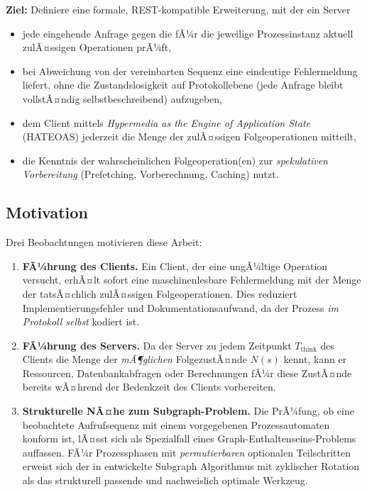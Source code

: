 ﻿\documentclass[a4paper,12pt]{article}
\theoremstyle{definition}
\begin{document}
\textbf{Ziel:} Definiere eine formale, REST-kompatible Erweiterung, mit der ein Server
\begin{itemize}
	\item jede eingehende Anfrage gegen die fÃ¼r die jeweilige Prozessinstanz aktuell
	      zulÃ¤ssigen Operationen prÃ¼ft,
	\item bei Abweichung von der vereinbarten Sequenz eine eindeutige Fehlermeldung liefert,
	      ohne die Zustandslosigkeit auf Protokollebene (jede Anfrage bleibt vollstÃ¤ndig
	      selbstbeschreibend) aufzugeben,
	\item dem Client mittels \emph{Hypermedia as the Engine of Application State}
	      (HATEOAS) jederzeit die Menge der zulÃ¤ssigen Folgeoperationen mitteilt,
	\item die Kenntnis der wahrscheinlichen Folgeoperation(en) zur \emph{spekulativen
	      Vorbereitung} (Prefetching, Vorberechnung, Caching) nutzt.
\end{itemize}

\subsection{Motivation}

Drei Beobachtungen motivieren diese Arbeit:

\begin{enumerate}
	\item \textbf{FÃ¼hrung des Clients.} Ein Client, der eine ungÃ¼ltige Operation
	      versucht, erhÃ¤lt sofort eine maschinenlesbare Fehlermeldung mit der Menge der
	      tatsÃ¤chlich zulÃ¤ssigen Folgeoperationen. Dies reduziert Implementierungsfehler
	      und Dokumentationsaufwand, da der Prozess \emph{im Protokoll selbst} kodiert ist.
	\item \textbf{FÃ¼hrung des Servers.} Da der Server zu jedem Zeitpunkt $T_{\text{think}}$
	      des Clients die Menge der \emph{mÃ¶glichen} FolgezustÃ¤nde $N(s)$ kennt, kann er
	      Ressourcen, Datenbankabfragen oder Berechnungen fÃ¼r diese ZustÃ¤nde bereits wÃ¤hrend
	      der Bedenkzeit des Clients vorbereiten.
	\item \textbf{Strukturelle NÃ¤he zum Subgraph-Problem.} Die PrÃ¼fung, ob eine beobachtete
	      Aufrufsequenz mit einem vorgegebenen Prozessautomaten konform ist, lÃ¤sst sich als
	      Spezialfall eines Graph-Enthaltenseins-Problems auffassen. FÃ¼r Prozessphasen mit
	      \emph{permutierbaren} optionalen Teilschritten erweist sich der in
	      \cite{epp2026subgraph} entwickelte Subgraph Algorithmus mit zyklischer Rotation
	      als das strukturell passende und nachweislich optimale Werkzeug.
\end{enumerate}
\end{document}
